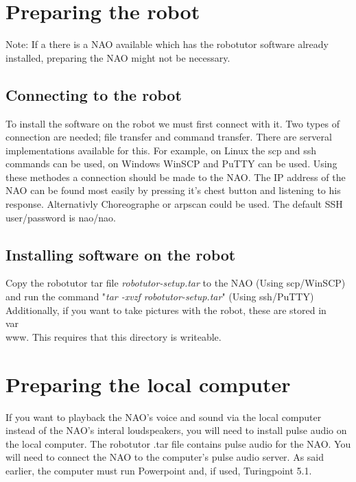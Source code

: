 
\section{Preparing the robot}
Note: If a there is a NAO available which has the robotutor software already installed, preparing the NAO might not be necessary.

\subsection{Connecting to the robot}
To install the software on the robot we must first connect with it. Two types of connection are needed; file transfer and command transfer. There are serveral implementations available for this. For example, on Linux the scp and ssh commands can be used, on Windows WinSCP and PuTTY can be used. Using these methodes a connection should be made to the NAO. The IP address of the NAO can be found most easily by pressing it's chest button and listening to his response. Alternativly Choreographe or arpscan could be used. The default SSH user/password is nao/nao. 

\subsection{Installing software on the robot}

Copy the robotutor tar file \emph{robotutor-setup.tar} to the NAO  (Using scp/WinSCP) and run the command "\emph{tar -xvzf robotutor-setup.tar}" (Using ssh/PuTTY)
Additionally, if you want to take pictures with the robot, these are stored in \\var\\www. This requires that this directory is writeable.

\section{Preparing the local computer}
If you want to playback the NAO's voice and sound via the local computer instead of the NAO's interal loudspeakers, you will need to install pulse audio on the local computer. The robotutor .tar file contains pulse audio for the NAO. You will need to connect the NAO to the computer's pulse audio server. As said earlier, the computer must run Powerpoint and, if used, Turingpoint 5.1.

